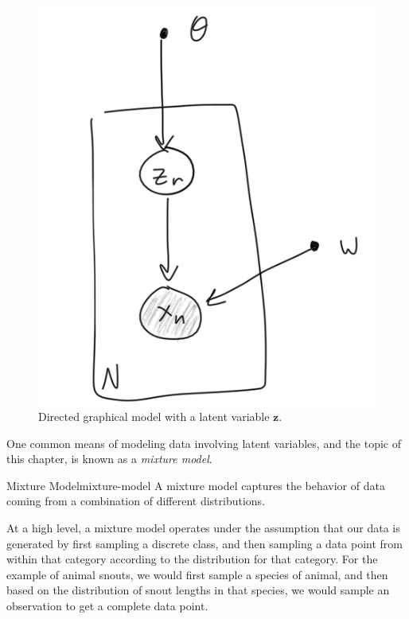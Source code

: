 \begin{figure}
    \centering
    \includegraphics[width=0.3\paperwidth]{../MixtureModels/fig/latent-variable-dgm.png}
    \caption{Directed graphical model with a latent variable $\textbf{z}$.}
    \label{fig:lvm-dgm}
\end{figure}

One common means of modeling data involving latent variables, and the topic of this chapter, is known as a \textit{mixture model}.

\begin{definition}{Mixture Model}{mixture-model}
    A mixture model captures the behavior of data coming from a combination of different distributions.
\end{definition}

At a high level, a mixture model operates under the assumption that our data is generated by first sampling a discrete class, and then sampling a data point from within that category according to the distribution for that category. For the example of animal snouts, we would first sample a species of animal, and then based on the distribution of snout lengths in that species, we would sample an observation to get a complete data point.

